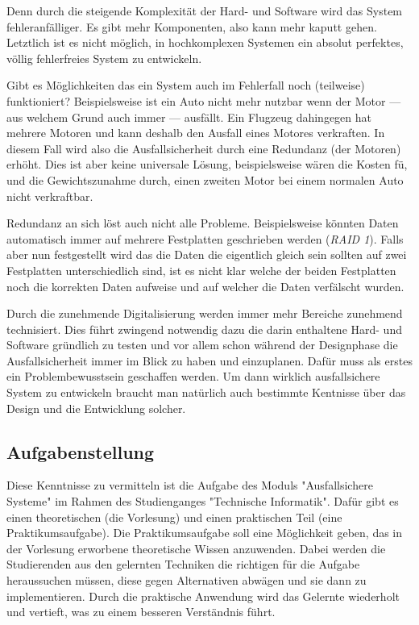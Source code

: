 Denn durch die steigende Komplexit{\"{a}}t der Hard- und Software wird das System fehleranf{\"{a}}lliger. Es gibt 
mehr Komponenten, also kann mehr kaputt gehen. Letztlich ist es nicht m{\"{o}}glich, in hochkomplexen Systemen ein 
absolut perfektes, v{\"{o}}llig fehlerfreies System zu entwickeln. 

Gibt es M{\"{o}}glichkeiten das ein System auch im Fehlerfall noch (teilweise) funktioniert? Beispielsweise ist ein
Auto nicht mehr nutzbar wenn der Motor --- aus welchem Grund auch immer --- ausf{\"{a}}llt. Ein Flugzeug dahingegen
hat mehrere Motoren und kann deshalb den Ausfall eines Motores verkraften. In diesem Fall wird also die Ausfallsicherheit
durch eine Redundanz (der Motoren) erh{\"{o}}ht. Dies ist aber keine universale L{\"{o}}sung, beispielsweise w{\"{a}}ren
die Kosten f{\"{u}}, und die Gewichtszunahme durch, einen zweiten Motor bei einem normalen Auto nicht verkraftbar.

Redundanz an sich l{\"{o}}st auch nicht alle Probleme. Beispielsweise k{\"{o}}nnten Daten automatisch immer auf mehrere
Festplatten geschrieben werden (\textit{RAID 1}). Falls aber nun festgestellt wird das die Daten die eigentlich gleich
sein sollten auf zwei Festplatten unterschiedlich sind, ist es nicht klar welche der beiden Festplatten noch die korrekten
Daten aufweise und auf welcher die Daten verf{\"{a}}lscht wurden. 

Durch die zunehmende Digitalisierung werden immer mehr Bereiche zunehmend technisiert. Dies f{\"{u}}hrt zwingend notwendig
dazu die darin enthaltene Hard- und Software gr{\"{u}}ndlich zu  testen und vor allem schon w{\"{a}}hrend der Designphase
die Ausfallsicherheit immer im Blick zu haben und einzuplanen. Daf{\"{u}}r muss als erstes ein Problembewusstsein geschaffen
werden. Um dann wirklich ausfallsichere System zu entwickeln braucht man nat{\"{u}}rlich auch bestimmte Kentnisse 
{\"{u}}ber das Design und die Entwicklung solcher.

\subsection{Aufgabenstellung} 
Diese Kenntnisse zu vermitteln ist die Aufgabe des Moduls "Ausfallsichere Systeme" im Rahmen des Studienganges 
"Technische Informatik". Daf{\"{u}}r gibt es einen theoretischen (die Vorlesung) und einen praktischen Teil (eine 
Praktikumsaufgabe). Die Praktikumsaufgabe soll eine M{\"{o}}glichkeit geben, das in der Vorlesung erworbene 
theoretische Wissen anzuwenden. Dabei werden die Studierenden aus den gelernten Techniken die richtigen 
f{\"{u}}r die Aufgabe heraussuchen m{\"{u}}ssen, diese gegen Alternativen abw{\"{a}}gen und sie dann zu 
implementieren. Durch die  praktische Anwendung wird das Gelernte wiederholt und vertieft, was zu einem besseren 
Verst{\"{a}}ndnis f{\"{u}}hrt. 

